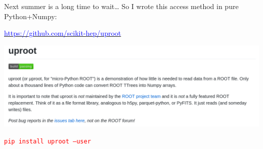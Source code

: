\documentclass[aspectratio=169]{beamer}
\begin{document}
\begin{frame}{Next summer is a long time to wait\ldots}
\vspace{0.5 cm}
So I wrote this access method in pure Python+Numpy:

\begin{center}
\href{https://github.com/scikit-hep/uproot}{\textcolor{blue}{\Large https://github.com/scikit-hep/uproot}}
\end{center}

\includegraphics[width=\linewidth]{uproot.png}

\begin{center}
\Large \textcolor{red}{\tt pip install uproot --user}
\end{center}
\end{frame}
\end{document}
